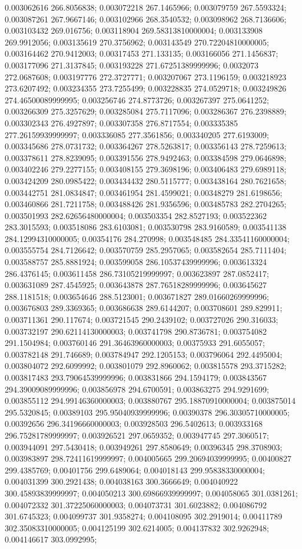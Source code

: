 0.003062616 266.8056838; 0.003072218 267.1465966; 0.003079759 267.5593324; 0.003087261 267.9667146; 0.003102966 268.3540532; 0.003098962 268.7136606; 0.003103432 269.016756; 0.003118904 269.58313810000004; 0.003133908 269.9912056; 0.003135619 270.3756962; 0.003143549 270.72204810000005; 0.003164462 270.9412003; 0.00317453 271.133135; 0.003166056 271.1456837; 0.003177096 271.3137845; 0.003193228 271.67251389999996; 0.0032073 272.0687608; 0.003197776 272.3727771; 0.003207067 273.1196159; 0.003218923 273.6207492; 0.003234355 273.7255499; 0.003228835 274.0529718; 0.003249826 274.46500089999995; 0.003256746 274.8773726; 0.003267397 275.0641252; 0.003266309 275.3257629; 0.003285084 275.7117096; 0.003286367 276.2398889; 0.003302343 276.4927897; 0.003307358 276.8717554; 0.003335385 277.26159939999997; 0.003336085 277.3561856; 0.003340205 277.6193009; 0.003345686 278.0731732; 0.003364267 278.5263817; 0.003356143 278.7259613; 0.003378611 278.8239095; 0.003391556 278.9492463; 0.003384598 279.0646898; 0.003402246 279.2277155; 0.003408155 279.3698196; 0.003406483 279.6989118; 0.003424209 280.0985422; 0.003434432 280.5115777; 0.003438164 280.7621658; 0.003442751 281.0834847; 0.003461954 281.4599021; 0.00348279 281.6198656; 0.003460866 281.7211758; 0.003488426 281.9356596; 0.003485783 282.2704265; 0.003501993 282.62656480000004; 0.003503354 282.8527193; 0.003522362 283.3015593; 0.003518086 283.6103081; 0.003530798 283.9160589; 0.003541138 284.12994310000005; 0.00354176 284.270998; 0.003548485 284.33541160000004; 0.003555754 284.7126642; 0.003570759 285.2957065; 0.003582654 285.7111404; 0.003588757 285.8881924; 0.003599058 286.10537439999996; 0.003613324 286.4376145; 0.003611458 286.73105219999997; 0.003623897 287.0852417; 0.003631089 287.4545925; 0.003643878 287.76518289999996; 0.003645627 288.1181518; 0.003654646 288.5123001; 0.003671827 289.01660269999996; 0.003676803 289.3369365; 0.003686638 289.6144207; 0.003708601 289.829911; 0.003711361 290.117674; 0.003721545 290.2439102; 0.003727026 290.316033; 0.003732197 290.62114130000003; 0.003741798 290.8736781; 0.003754082 291.1504984; 0.003760146 291.36463960000003; 0.00375933 291.6055057; 0.003782148 291.746689; 0.003784947 292.1205153; 0.003796064 292.4495004; 0.003804072 292.6099992; 0.003801079 292.8960062; 0.003815578 293.3715282; 0.003817483 293.79064539999996; 0.003831866 294.1594179; 0.003843567 294.39009089999996; 0.003856978 294.6700591; 0.003863275 294.9291699; 0.003855112 294.99146360000003; 0.003880767 295.18870910000004; 0.003875014 295.5320845; 0.00389103 295.95040939999996; 0.00390378 296.30305710000005; 0.00392656 296.34196660000003; 0.003928503 296.5402613; 0.003933168 296.75281789999997; 0.003926521 297.0659352; 0.003947745 297.3060517; 0.003944091 297.5430418; 0.003949261 297.8580649; 0.00396345 298.3708903; 0.003983897 298.72411619999997; 0.004005665 299.20694039999995; 0.00400827 299.4385769; 0.00401756 299.6489064; 0.004018143 299.95838330000004; 0.004031399 300.2921438; 0.004038163 300.3666649; 0.004040922 300.45893839999997; 0.004050213 300.69866939999997; 0.004058065 301.0381261; 0.004072332 301.37225060000003; 0.004073731 301.6023882; 0.004086792 301.6745323; 0.004099737 301.9358274; 0.004108095 302.2919014; 0.00411789 302.35083310000005; 0.004125199 302.6214005; 0.004137832 302.9262948; 0.004146617 303.0992995; 